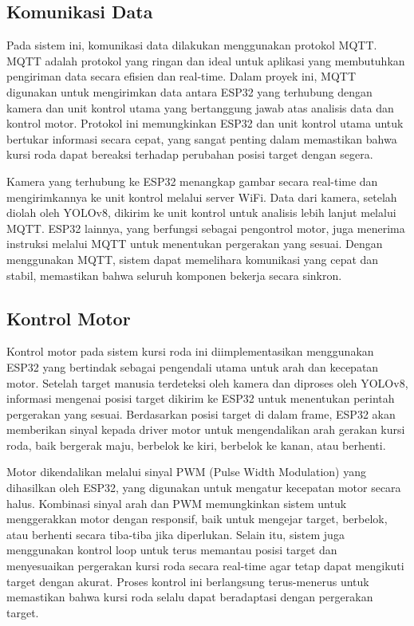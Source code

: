 \subsection{Komunikasi Data}
\label{subsec:komunikasi_data}

Pada sistem ini, komunikasi data dilakukan menggunakan protokol MQTT. MQTT adalah protokol yang ringan dan ideal untuk aplikasi yang membutuhkan pengiriman data secara efisien dan real-time. Dalam proyek ini, MQTT digunakan untuk mengirimkan data antara ESP32 yang terhubung dengan kamera dan unit kontrol utama yang bertanggung jawab atas analisis data dan kontrol motor. Protokol ini memungkinkan ESP32 dan unit kontrol utama untuk bertukar informasi secara cepat, yang sangat penting dalam memastikan bahwa kursi roda dapat bereaksi terhadap perubahan posisi target dengan segera.

Kamera yang terhubung ke ESP32 menangkap gambar secara real-time dan mengirimkannya ke unit kontrol melalui server WiFi. Data dari kamera, setelah diolah oleh YOLOv8, dikirim ke unit kontrol untuk analisis lebih lanjut melalui MQTT. ESP32 lainnya, yang berfungsi sebagai pengontrol motor, juga menerima instruksi melalui MQTT untuk menentukan pergerakan yang sesuai. Dengan menggunakan MQTT, sistem dapat memelihara komunikasi yang cepat dan stabil, memastikan bahwa seluruh komponen bekerja secara sinkron.

\subsection{Kontrol Motor}
\label{subsec:kontrol_motor}

Kontrol motor pada sistem kursi roda ini diimplementasikan menggunakan ESP32 yang bertindak sebagai pengendali utama untuk arah dan kecepatan motor. Setelah target manusia terdeteksi oleh kamera dan diproses oleh YOLOv8, informasi mengenai posisi target dikirim ke ESP32 untuk menentukan perintah pergerakan yang sesuai. Berdasarkan posisi target di dalam frame, ESP32 akan memberikan sinyal kepada driver motor untuk mengendalikan arah gerakan kursi roda, baik bergerak maju, berbelok ke kiri, berbelok ke kanan, atau berhenti.

Motor dikendalikan melalui sinyal PWM (Pulse Width Modulation) yang dihasilkan oleh ESP32, yang digunakan untuk mengatur kecepatan motor secara halus. Kombinasi sinyal arah dan PWM memungkinkan sistem untuk menggerakkan motor dengan responsif, baik untuk mengejar target, berbelok, atau berhenti secara tiba-tiba jika diperlukan. Selain itu, sistem juga menggunakan kontrol loop untuk terus memantau posisi target dan menyesuaikan pergerakan kursi roda secara real-time agar tetap dapat mengikuti target dengan akurat. Proses kontrol ini berlangsung terus-menerus untuk memastikan bahwa kursi roda selalu dapat beradaptasi dengan pergerakan target.

